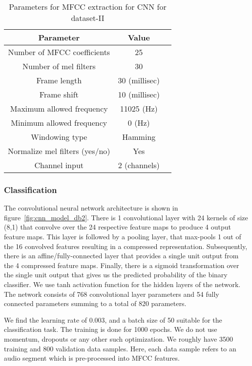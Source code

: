 \begin{table}[tb]
\caption[Parameters for MFCC extraction for CNN for dataset-II]{Parameters for MFCC extraction for CNN  for dataset-II}
\label{tab:param_mfcc_cnn_db2}
\centering
\begin{tabular}{ccc}
\toprule
Parameter & Value \\
\midrule
Number of MFCC coefficients	& 25\\
Number of mel filters	& 30\\
Frame length & 30 (millisec)\\
Frame shift 	& 10 (millisec)\\
Maximum allowed frequency & 11025 (Hz)\\
Minimum allowed frequency & 0 (Hz)\\
Windowing type & Hamming\\
Normalize mel filters (yes/no) & Yes \\
Channel input & 2 (channels) \\
\bottomrule 
\end{tabular}
\end{table}

\subsubsection{Classification}
The convolutional neural network architecture is shown in figure~\ref{fig:cnn_model_db2}. There is 1 convolutional layer with 24 kernels of size (8,1) that convolve over the 24 respective feature maps to produce 4 output feature maps. This layer is followed by a pooling layer, that max-pools 1 out of the 16 convolved features resulting in a compressed representation. Subsequently, there is an affine/fully-connected layer that provides a single unit output from the 4 compressed feature maps. Finally, there is a sigmoid transformation over the single unit output that gives us the predicted probability of the binary classifier. We use tanh activation function for the hidden layers of the network. The network consists of 768 convolutional layer parameters and 54 fully connected parameters summing to a total of 820 parameters.

We find the learning rate of 0.003, and a batch size of 50 suitable for the classification task. The training is done for 1000 epochs. We do not use momentum, dropouts or any other such optimization. We roughly have 3500 training and 800 validation data samples. Here, each data sample refers to an audio segment which is pre-processed into MFCC features.

